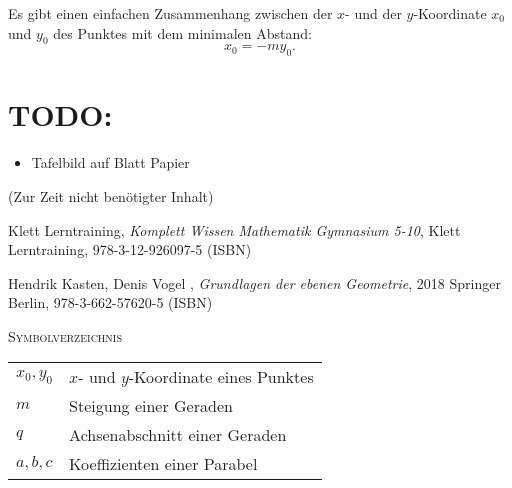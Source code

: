 \documentclass[a4paper]{amsart}
\theoremstyle{definition}
\begin{document}
Es gibt einen einfachen Zusammenhang zwischen der $x$- und der $y$-Koordinate $x_0$ und $y_0$ des Punktes mit dem minimalen Abstand:
\begin{equation}
   x_0 = -my_0.
\end{equation}

\section{TODO:}
\begin{itemize}
   \item Tafelbild auf Blatt Papier
\end{itemize}

\begin{backup}
    (Zur Zeit nicht benötigter Inhalt)
\end{backup}

\begin{thebibliography}{9}

      Klett Lerntraining, \emph{Komplett Wissen Mathematik Gymnasium 5-10},
      Klett Lerntraining, 978-3-12-926097-5 (ISBN)
   
      Hendrik Kasten, Denis Vogel , \emph{Grundlagen der ebenen Geometrie},
      2018 Springer Berlin, 978-3-662-57620-5 (ISBN)

\end{thebibliography}

\begin{large}
    \centerline{\textsc{Symbolverzeichnis}}
\end{large}
\bigskip

\renewcommand*{\arraystretch}{1}

\begin{tabular}{ll}
    $x_0, y_0$          & $x$- und $y$-Koordinate eines Punktes\\
    $m$                 & Steigung einer Geraden\\
    $q$                 & Achsenabschnitt einer Geraden\\
    $a, b, c$           & Koeffizienten einer Parabel

\end{tabular}
\end{document}
